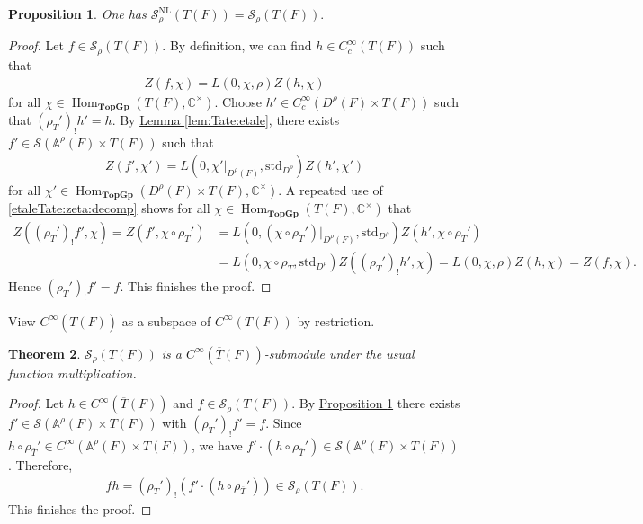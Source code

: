 \documentclass[10pt]{amsart}
\newtheorem{theorem}{Theorem}[section]
\newtheorem{proposition}[theorem]{Proposition}
\theoremstyle{definition}
\numberwithin{equation}{section}
\DeclareMathOperator{\Hom}{\mathrm{Hom}}
\numberwithin{equation}{subsection}
\newcommand{\CC}{\mathbb{C}}
\begin{document}
\begin{proposition}\label{NL=Srho} One has $\mathcal{S}^{\mathrm{NL}}_\rho(T(F))=\mathcal{S}_\rho(T(F)).$
\end{proposition}
\begin{proof} Let $f\in \mathcal{S}_\rho(T(F))$. By definition, we can find $h\in C_c^\infty(T(F))$ such that
\begin{align*}
    Z(f,\chi) = L(0,\chi,\rho)Z(h,\chi) 
\end{align*}
for all $\chi\in\Hom_{\textbf{TopGp}}(T(F),\CC^\times)$. Choose $h'\in C_c^\infty(D^\rho(F) \times T(F))$ such that $(\rho_T')_!h' = h$. By \hyperref[lem:Tate:etale]{Lemma \ref{lem:Tate:etale}}, there exists $f'\in \mathcal{S}(\mathbb{A}^\rho(F)\times T(F))$ such that
\begin{align*}
    Z(f',\chi') = L(0,\chi'\vert_{D^\rho(F)},\mathrm{std}_{D^\rho})Z(h',\chi')
\end{align*}
for all $\chi'\in \Hom_{\textbf{TopGp}}(D^\rho(F)\times T(F),\CC^\times)$. A repeated use of \eqref{etaleTate:zeta:decomp} shows for all $\chi\in\Hom_{\textbf{TopGp}}(T(F),\CC^\times)$ that
\begin{align*}
    Z((\rho_T')_!f',\chi) = Z(f',\chi\circ \rho_T') &=  L(0,(\chi\circ \rho_T')\vert_{D^\rho(F)},\mathrm{std}_{D^\rho})Z(h',\chi\circ \rho_T')\\
    &= L(0,\chi\circ \rho_T,\mathrm{std}_{D^\rho})Z((\rho_T')_!h',\chi)= L(0,\chi,\rho)Z(h,\chi) = Z(f,\chi).
\end{align*}
Hence $(\rho_T')_!f' = f$. This finishes the proof.
\end{proof}

View $C^\infty(\overline{T}(F))$ as a subspace of $C^\infty(T(F))$ by restriction.
\begin{theorem}\label{thm:localT}
$\mathcal{S}_\rho(T(F))$ is a $C^\infty(\overline{T}(F))$-submodule under the usual function multiplication.
\end{theorem}
\begin{proof} Let $h\in C^\infty(\overline{T}(F))$ and  $f\in \mathcal{S}_\rho(T(F))$. By \hyperref[NL=Srho]{Proposition \ref{NL=Srho}} there exists $f'\in \mathcal{S}(\mathbb{A}^\rho(F)\times T(F))$ with $(\rho_T')_!f' = f$. Since $h\circ \rho_{\overline{T}}'\in C^\infty(\mathbb{A}^\rho(F)\times T(F))$, we have $f'\cdot (h\circ\rho_{\overline{T}}')\in\mathcal{S}(\mathbb{A}^\rho(F)\times T(F))$. Therefore,
\begin{align*}
    fh = (\rho_T')_!(f'\cdot (h\circ\rho_{\overline{T}}')) \in \mathcal{S}_\rho(T(F)).
\end{align*}
This finishes the proof.
\end{proof}
\end{document}
